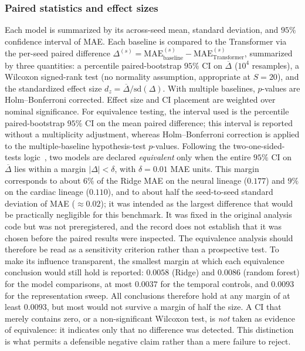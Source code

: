 \documentclass[10pt,letterpaper]{article}
\begin{document}
\subsubsection*{Paired statistics and effect sizes}
Each model is summarized by its across-seed mean, standard deviation, and $95\%$ confidence interval of MAE. Each baseline is compared to the Transformer via the per-seed paired difference $\Delta^{(s)} = \mathrm{MAE}^{(s)}_{\text{baseline}} - \mathrm{MAE}^{(s)}_{\text{Transformer}}$, summarized by three quantities: a percentile paired-bootstrap $95\%$ CI on $\overline{\Delta}$ ($10^4$ resamples), a Wilcoxon signed-rank test (no normality assumption, appropriate at $S=20$), and the standardized effect size $d_z=\overline{\Delta}/\mathrm{sd}(\Delta)$. With multiple baselines, $p$-values are Holm--Bonferroni corrected. Effect size and CI placement are weighted over nominal significance. For equivalence testing, the interval used is the percentile paired-bootstrap $95\%$ CI on the mean paired difference; this interval is reported without a multiplicity adjustment, whereas Holm--Bonferroni correction is applied to the multiple-baseline hypothesis-test $p$-values. Following the two-one-sided-tests logic~\cite{lakens2017equivalence}, two models are declared \emph{equivalent} only when the entire $95\%$ CI on $\overline{\Delta}$ lies within a margin $|\Delta|<\delta$, with $\delta=0.01$ MAE units. This margin corresponds to about $6\%$ of the Ridge MAE on the neural lineage ($0.177$) and $9\%$ on the cardiac lineage ($0.110$), and to about half the seed-to-seed standard deviation of MAE ($\approx0.02$); it was intended as the largest difference that would be practically negligible for this benchmark. It was fixed in the original analysis code but was not preregistered, and the record does not establish that it was chosen before the paired results were inspected. The equivalence analysis should therefore be read as a sensitivity criterion rather than a prospective test. To make its influence transparent, the smallest margin at which each equivalence conclusion would still hold is reported: $0.0058$ (Ridge) and $0.0086$ (random forest) for the model comparisons, at most $0.0037$ for the temporal controls, and $0.0093$ for the representation sweep. All conclusions therefore hold at any margin of at least $0.0093$, but most would not survive a margin of half the size. A CI that merely contains zero, or a non-significant Wilcoxon test, is \emph{not} taken as evidence of equivalence: it indicates only that no difference was detected. This distinction is what permits a defensible negative claim rather than a mere failure to reject.
\end{document}
